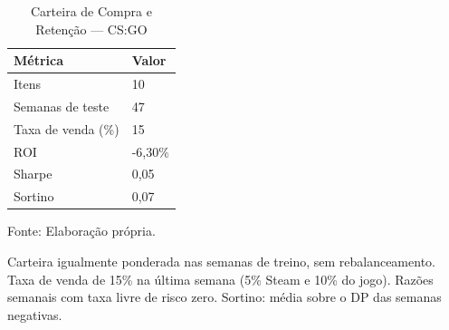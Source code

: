 \begin{table}[H]
\caption{Carteira de Compra e Retenção — CS:GO}\label{tab:portfolio} 

\fontsize{12.0pt}{14.4pt}\selectfont

\begin{tabular*}{\linewidth}{@{\extracolsep{\fill}}ll}
\toprule
\textbf{Métrica} & \textbf{Valor} \\
\midrule\addlinespace[2.5pt]
Itens & 10 \\
Semanas de teste & 47 \\
Taxa de venda (\%) & 15 \\
ROI & -6,30\% \\
Sharpe & 0,05 \\
Sortino & 0,07 \\
\bottomrule
\end{tabular*}
\par\vspace{\belowcaptionskip}\footnotesize Fonte: Elaboração própria.\par
\begin{minipage}{\linewidth}
Carteira igualmente ponderada nas semanas de treino, sem rebalanceamento. Taxa de venda de 15\% na última semana (5\% Steam e 10\% do jogo). Razões semanais com taxa livre de risco zero. Sortino: média sobre o DP das semanas negativas.\\
\end{minipage}
\end{table}
